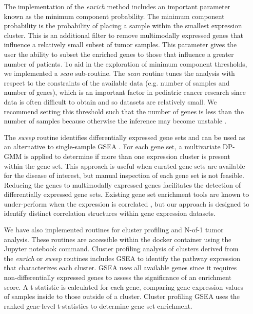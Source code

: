 \documentclass[10pt,letterpaper]{article}
\begin{document}
The implementation of the \textit{enrich} method includes an important parameter known as the minimum component probability. The minimum component probability is the probability of placing a sample within the smallest expression cluster. This is an additional filter to remove multimodally expressed genes that influence a relatively small subset of tumor samples. This parameter gives the user the ability to subset the enriched genes to those that influence a greater number of patients. To aid in the exploration of minimum component thresholds, we implemented a \textit{scan} sub-routine. The \textit{scan} routine tunes the analysis with respect to the constraints of the available data (e.g. number of samples and number of genes), which is an important factor in pediatric cancer research since data is often difficult to obtain and so datasets are relatively small. We recommend setting this threshold such that the number of genes is less than the number of samples because otherwise the inference may become unstable \cite{caiConstrainedL1Minimization2011}.

The \textit{sweep} routine identifies differentially expressed gene sets and can be used as an alternative to single-sample GSEA \cite{subramanianGeneSetEnrichment2005}. For each gene set, a multivariate DP-GMM is applied to determine if more than one expression cluster is present within the gene set. This approach is useful when curated gene sets are available for the disease of interest, but manual inspection of each gene set is not feasible. Reducing the genes to multimodally expressed genes facilitates the detection of differentially expressed gene sets. Existing gene set enrichment tools are known to under-perform when the expression is correlated \cite{tamayoLimitationsSimpleGene2016}, but our approach is designed to identify distinct correlation structures within gene expression datasets.

We have also implemented routines for cluster profiling and N-of-1 tumor analysis. These routines are accessible within the docker container using the Jupyter notebook command. Cluster profiling analysis of clusters derived from the \textit{enrich} or \textit{sweep} routines includes GSEA \cite{korotkevichFastGeneSet2019} to identify the pathway expression that characterizes each cluster. GSEA uses all available genes since it requires non-differentially expressed genes to assess the significance of an enrichment score. A t-statistic is calculated for each gene, comparing gene expression values of samples inside to those outside of a cluster. Cluster profiling GSEA uses the ranked gene-level t-statistics to determine gene set enrichment.
\end{document}
